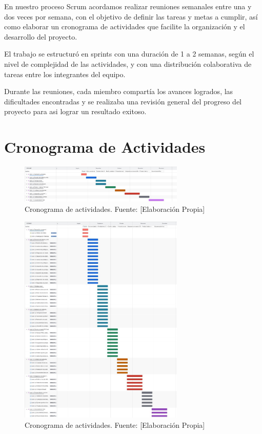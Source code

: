 {{En nuestro proceso Scrum acordamos realizar reuniones semanales entre una y dos veces por semana, con el objetivo de definir las tareas y metas a cumplir, así como elaborar un cronograma de actividades que facilite la organización y el desarrollo del proyecto.

El trabajo se estructuró en sprints con una duración de 1 a 2 semanas, según el nivel de complejidad de las actividades, y con una distribución colaborativa de tareas entre los integrantes del equipo.

Durante las reuniones, cada miembro compartía los avances logrados, las dificultades encontradas y se realizaba una revisión general del progreso del proyecto para asi lograr un resultado exitoso.

\section{Cronograma de Actividades}

 \vspace{1em}
  
   \begin{figure}[H]
        \centering
        \includegraphics[width=0.7\textwidth]{../img/Cronograma .jpeg}
     \caption{Cronograma de actividades. Fuente: [Elaboración Propia]}
     \label{fig:cronograma1}
    \end{figure} 

    \begin{figure}[H]
    \centering
      \includegraphics[width=0.7\textwidth]{../img/Cronograma 2.jpeg}
      \caption{Cronograma de actividades. Fuente: [Elaboración Propia]}
      \label{fig:cronograma}
       \end{figure}


}}
